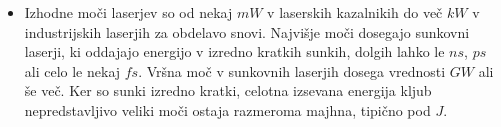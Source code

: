 \begin{itemize}
\item Izhodne moči laserjev so od nekaj $\si{mW}$ v laserskih kazalnikih do 
več $\si{kW}$ v industrijskih laserjih za obdelavo snovi. Najvišje moči 
dosegajo sunkovni laserji, ki oddajajo energijo
v izredno kratkih sunkih, dolgih lahko le $\si{ns}$, $\si{ps}$ ali celo 
le nekaj $\si{fs}$. Vršna moč v sunkovnih laserjih dosega
vrednosti $\si{GW}$ ali še več. Ker so sunki izredno kratki, celotna izsevana 
energija kljub nepredstavljivo veliki moči ostaja razmeroma majhna, tipično 
pod $\si{J}$.
\end{itemize}
